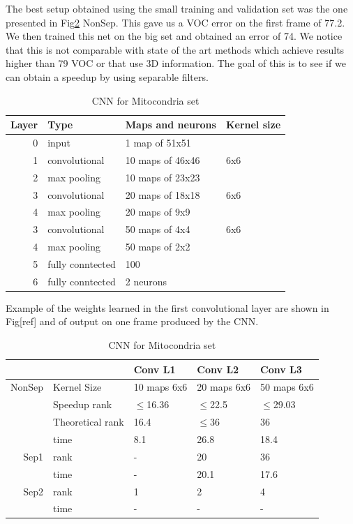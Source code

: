 The best setup obtained using the small training and validation set was the one presented in Fig\ref{fig:CNN3} NonSep. This gave us a VOC error on the first frame of 77.2. We then trained this net on the big set and obtained an error of 74. We notice that this is not comparable with state of the art methods which achieve results higher than 79 VOC or that use 3D information. The goal of this
is to see if we can obtain a speedup by using separable filters.
\begin{table}
\centering
\begin{tabular}{@{}rlll@{}}\toprule
Layer & Type & Maps and neurons& Kernel size \\ \midrule
0 & input & 1 map of 51x51 &\\
1& convolutional & 10 maps of 46x46 & 6x6\\
2 & max pooling & 10 maps of 23x23 &  \\
3 & convolutional & 20 maps of 18x18& 6x6 \\
4 & max pooling & 20 maps of 9x9& \\ 
3 & convolutional & 50 maps of 4x4& 6x6 \\
4 & max pooling & 50 maps of 2x2& \\ 
5 & fully conntected& 100 & \\
6 & fully conntected & 2 neurons & \\ \bottomrule
\end{tabular}
\caption{CNN for Mitocondria set}
\label{fig:CNN3}
\end{table}
Example of the weights learned in the first convolutional layer are shown in Fig[ref] and of output on one frame produced by the CNN. 
\begin{table}
\centering
\begin{tabular}{@{}rllll@{}}\toprule
 &&Conv L1& Conv L2 & Conv L3\\ \midrule
NonSep &Kernel Size & 10 maps 6x6& 20 maps 6x6 & 50 maps 6x6\\
&Speedup rank& $\leq$16.36 & $\leq$22.5 & $\leq$29.03\\
&Theoretical rank & 16.4 & $\leq$36 & 36 \\ 
&time & 8.1 & 26.8 & 18.4 \\ \midrule
Sep1& rank & - & 20 & 36 \\ 
& time& - & 20.1 & 17.6\\ \midrule
Sep2& rank & 1 & 2 & 4 \\ 
& time& - & - & -\\ \bottomrule
\end{tabular}
\caption{CNN for Mitocondria set}
\label{fig:CNN3}
\end{table}
